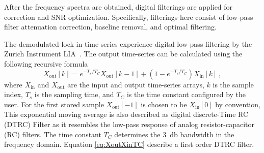 After the frequency spectra are obtained, digital filterings are applied for correction and SNR optimization. 
Specifically, filterings here consist of low-pass filter attenuation correction, baseline removal, and optimal filtering. 



The demodulated lock-in time-series experience digital low-pass filtering by the Zurich Instrument LIA~\cite{ZurichInstruments_MFIA_UserManual}. 
The output time-series can be calculated using the following recursive formula
\begin{equation}
    X_\mathrm{out}[k]=e^{-T_s/T_C} X_\mathrm{out}[k-1] + (1 - e^{-T_s/T_C}) X_\mathrm{in}[k] \,,
    \label{eq:XoutXinTC}
\end{equation}
where $X_\mathrm{in}$ and $X_\mathrm{out}$ are the input and output time-series arrays, $k$ is the sample index, $T_s$ is the sampling time, and $T_C$ is the time constant configured by the user. 
For the first stored sample $X_\mathrm{out}[-1]$ is chosen to be $X_\mathrm{in}[0]$ by convention, 
This exponential moving average is also described as digital discrete-Time RC (DTRC) Filter as it resembles the low-pass response of analog resistor-capacitor (RC) filters. 
The time constant $T_C$ determines the \SI{3}{\decibel} bandwidth in the frequency domain. 
Equation \eqref{eq:XoutXinTC} describe a first order DTRC filter. 
